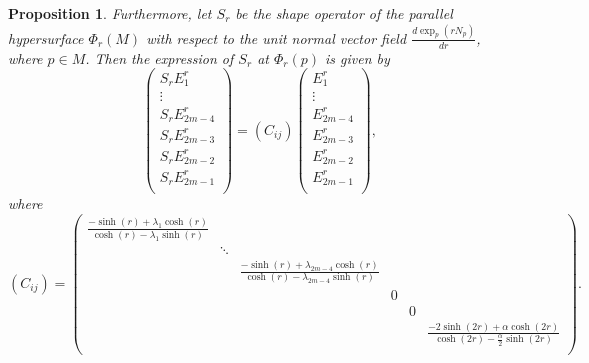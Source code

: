 \documentclass[reqno]{amsart}%
\newtheorem{proposition}[theorem]{Proposition}
\theoremstyle{definition}
\numberwithin{equation}{section}
\begin{document}
\begin{proposition}
Furthermore, let $S_r$ be the shape operator of the parallel hypersurface $\Phi_r(M)$
with respect to the unit normal vector field $\frac{d\exp_{p}(rN_{p})}{dr}$, where $p\in M$.
Then the expression of $S_r$ at $\Phi_r(p)$ is given by
\begin{equation}\label{eqn:Arr}
\left(
  \begin{array}{c}
    S_rE_1^r \\
    \vdots \\
    S_r E_{2m-4}^r \\
    S_r E_{2m-3}^r \\
    S_r E_{2m-2}^r \\
    S_r E_{2m-1}^r \\
  \end{array}
\right)=
(C_{ij})
\left(
  \begin{array}{c}
    E_1^r \\
    \vdots \\
    E_{2m-4}^r \\
    E_{2m-3}^r \\
    E_{2m-2}^r \\
    E_{2m-1}^r \\
  \end{array}
\right),
\end{equation}
where
\begin{equation}\label{Bij222}
(C_{ij})=
\left(
\begin{array}{cccccc}
\frac{-\sinh(r)+\lambda_1\cosh(r)}{\cosh(r)-\lambda_1\sinh(r)} & & & & & \\
 & \ddots & & & & \\
 & & \frac{-\sinh(r)+\lambda_{2m-4}\cosh(r)}{\cosh(r)-\lambda_{2m-4}\sinh(r)} & & & \\
  & &  & 0 & & \\
   & &  & & 0 & \\
    & &  & & & \frac{-2\sinh(2r)+\alpha\cosh(2r)}{\cosh(2r)-\frac{\alpha}{2}\sinh(2r)} \\
\end{array}
\right).
\end{equation}
\end{proposition}
%
\end{document}
